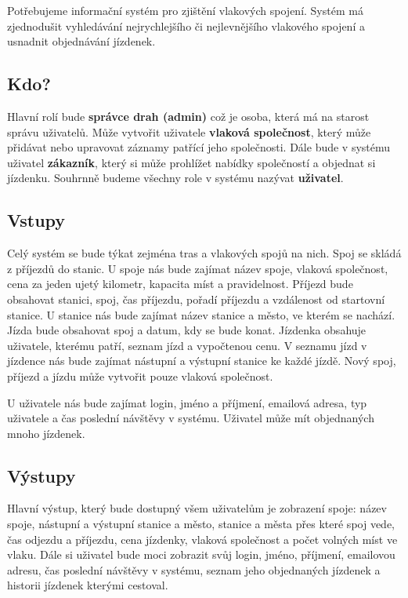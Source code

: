 \documentclass[11pt]{article}
\begin{document}
Potřebujeme informační systém pro zjištění vlakových spojení. Systém má zjednodušit vyhledávání nejrychlejšího či nejlevnějšího vlakového spojení a usnadnit objednávání jízdenek.

\subsection{Kdo?}
Hlavní rolí bude \textbf{správce drah (admin)} což je osoba, která má na starost správu uživatelů. Může vytvořit uživatele \textbf{vlaková společnost}, který může přidávat nebo upravovat záznamy patřící jeho společnosti. Dále bude v systému uživatel \textbf{zákazník}, který si může prohlížet nabídky společností a objednat si jízdenku. Souhrnně budeme všechny role v systému nazývat \textbf{uživatel}.

\subsection{Vstupy}
Celý systém se bude týkat zejména tras a vlakových spojů na nich. Spoj se skládá z příjezdů do stanic. U spoje nás bude zajímat název spoje, vlaková společnost, cena za jeden ujetý kilometr, kapacita míst a pravidelnost. Příjezd bude obsahovat stanici, spoj, čas příjezdu, pořadí příjezdu a vzdálenost od startovní stanice. U stanice nás bude zajímat název stanice a město, ve kterém se nachází. Jízda bude obsahovat spoj a datum, kdy se bude konat. Jízdenka obsahuje uživatele, kterému patří, seznam jízd a vypočtenou cenu. V seznamu jízd v jízdence nás bude zajímat nástupní a výstupní stanice ke každé jízdě. Nový spoj, příjezd a jízdu může vytvořit pouze vlaková společnost.

U uživatele nás bude zajímat login, jméno a příjmení, emailová adresa, typ uživatele a čas poslední návštěvy v systému. Uživatel může mít objednaných mnoho jízdenek.

\subsection{Výstupy}
Hlavní výstup, který bude dostupný všem uživatelům je zobrazení spoje: název spoje, nástupní a výstupní stanice a město, stanice a města přes které spoj vede, čas odjezdu a příjezdu, cena jízdenky, vlaková společnost a počet volných míst ve vlaku. Dále si uživatel bude moci zobrazit svůj login, jméno, příjmení, emailovou adresu, čas poslední návštěvy v systému, seznam jeho objednaných jízdenek a historii jízdenek kterými cestoval.
\end{document}

